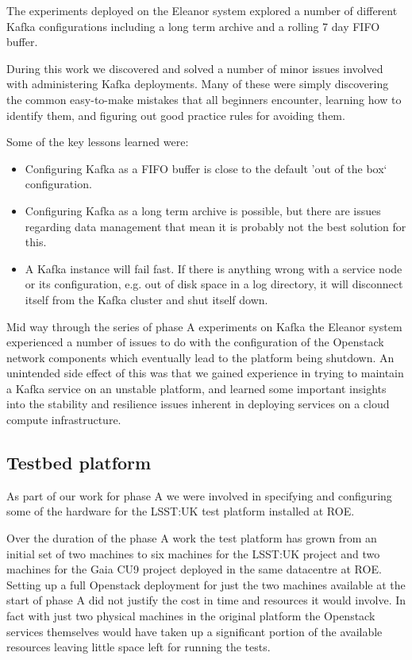 \documentclass{article}
\newcommand{\openstack} {Openstack\xspace}
\newcommand{\datacentre} {datacentre\xspace}
\newcommand{\kafka} {Kafka\xspace}
\newcommand{\fifo} {FIFO\xspace}
\newcommand{\phasea} {phase A\xspace}
\newcommand{\lsstuk} {LSST:UK\xspace}
\newcommand{\gaia} {Gaia\xspace}
\newcommand{\cunine} {CU9\xspace}
\newcommand{\roe} {ROE\xspace}
\newcommand{\testplatform} {test platform\xspace}
\newcommand{\eleanor} {Eleanor\xspace}
\newcommand{\hdisk} {disk\xspace}
\begin{document}
The experiments deployed on the \eleanor system explored a number of different \kafka configurations including a long term archive and a rolling 7 day FIFO buffer.

During this work we discovered and solved a number of minor issues involved with administering \kafka deployments. Many of these were simply discovering the common easy-to-make mistakes that all beginners encounter, learning how to identify them, and figuring out good practice rules for avoiding them.

Some of the key lessons learned were:
\begin{itemize}
    \item Configuring \kafka as a \fifo buffer is close to the default 'out of the box` configuration.
    \item Configuring \kafka as a long term archive is possible, but there are issues regarding data management that mean it is probably not the best solution for this. 
    \item A \kafka instance will fail fast. If there is anything wrong with a service node or its configuration, e.g. out of \hdisk space in a log directory, it will disconnect itself from the \kafka cluster and shut itself down.
\end{itemize}

Mid way through the series of \phasea experiments on \kafka the \eleanor system experienced a number of issues to do with the configuration of the \openstack network components which eventually lead to the platform being shutdown.
An unintended side effect of this was that we gained experience in trying to maintain a \kafka service on an unstable platform, and learned some important insights into the stability and resilience issues inherent in deploying services on a cloud compute infrastructure.

\subsection{Testbed platform}
\label{deployment-testbed.platform}

As part of our work for \phasea we were involved in specifying and configuring some of the hardware for the \lsstuk \testplatform installed at \roe.

Over the duration of the \phasea work the \testplatform has grown from an initial set of two machines to six machines for the \lsstuk project and two machines for the \gaia \cunine project deployed in the same \datacentre at \roe. Setting up a full \openstack deployment for just the two machines available at the start of \phasea did not justify the cost in time and resources it would involve. In fact with just two physical machines in the original platform the \openstack services themselves would have taken up a significant portion of the available resources leaving little space left for running the tests.
\end{document}

